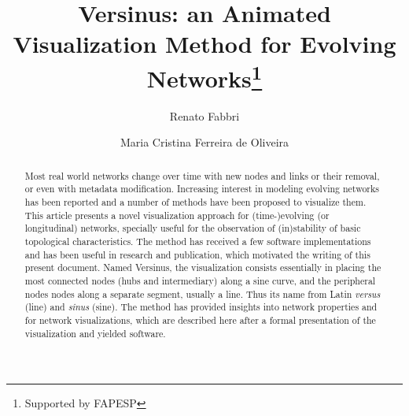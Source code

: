 \documentclass[runningheads]{llncs}
\begin{document}
%
\title{Versinus: an Animated Visualization Method for Evolving Networks\thanks{Supported by FAPESP}}
%
%
\author{Renato Fabbri \and
Maria Cristina Ferreira de Oliveira}
%
%
%
\maketitle              %
%
\begin{abstract}
Most real world networks change over time with new nodes and links or their removal, or even with metadata modification.
Increasing interest in modeling evolving networks has been reported and
a number of methods have been proposed to visualize them.  
  This article presents a novel visualization approach for (time-)evolving (or longitudinal) networks,
  specially useful for the observation of (in)stability of basic topological characteristics.
  The method has received a few software implementations and has been useful in research and publication, which motivated the writing of this present document.
  Named Versinus, the visualization consists essentially in placing the most connected nodes (hubs and intermediary) along a sine curve, and the peripheral nodes nodes along a separate segment, usually a line.
  Thus its name from  Latin \emph{versus} (line) and \emph{sinus} (sine).
  The method has provided insights into network properties and for network visualizations, which are described here after a formal presentation of the visualization and yielded software.


\end{abstract}
%
%
%
\end{document}
